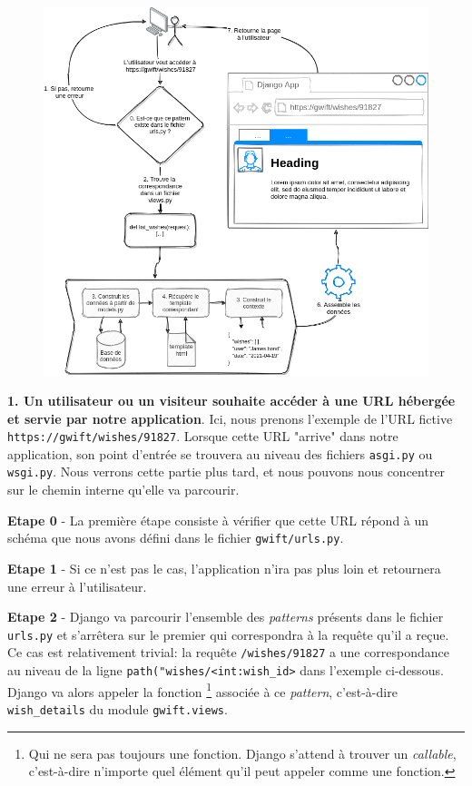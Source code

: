 \documentclass[11pt]{amsbook}
\begin{document}
\begin{figure}[h]{}
\centering\includegraphics[width=2.5truein]{images/diagrams/django-how-it-works.png}
\caption{}

\end{figure}

\textbf{1. Un utilisateur ou un visiteur souhaite accéder à une URL hébergée et servie par notre application}.
Ici, nous prenons l’exemple de l’URL fictive \texttt{https://gwift/wishes/91827}.
Lorsque cette URL "arrive" dans notre application, son point d’entrée se trouvera au niveau des fichiers \texttt{asgi.py} ou \texttt{wsgi.py}. Nous verrons cette partie plus tard, et nous pouvons nous concentrer sur le chemin interne qu’elle va parcourir.


\textbf{Etape 0} - La première étape consiste à vérifier que cette URL répond à un schéma que nous avons défini dans le fichier \texttt{gwift/urls.py}.


\textbf{Etape 1} - Si ce n’est pas le cas, l’application n’ira pas plus loin et retournera une erreur à l’utilisateur.


\textbf{Etape 2} - Django va parcourir l’ensemble des \emph{patterns} présents dans le fichier \texttt{urls.py} et s’arrêtera sur le premier qui correspondra à la requête qu’il a reçue.
Ce cas est relativement trivial: la requête \texttt{/wishes/91827} a une correspondance au niveau de la ligne \texttt{path("wishes/<int:wish\_id>} dans l’exemple ci-dessous.
Django va alors appeler la fonction \footnote{Qui ne sera pas toujours une fonction. Django s’attend à trouver un \emph{callable}, c’est-à-dire n’importe quel élément qu’il peut appeler comme une fonction.} associée à ce \emph{pattern}, c’est-à-dire \texttt{wish\_details} du module \texttt{gwift.views}.
\end{document}
